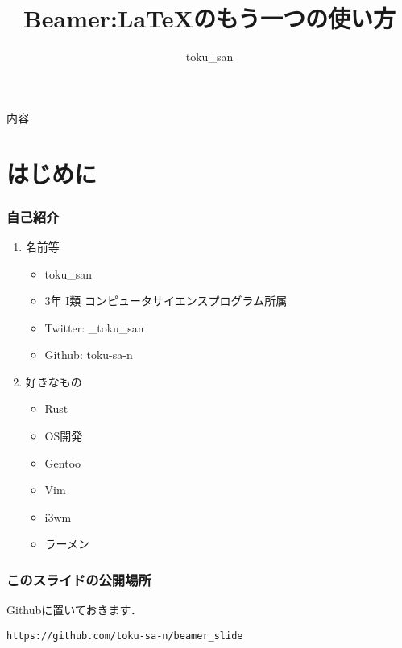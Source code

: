 \documentclass[dvipdfmx,uplatex,a4j,12pt]{beamer}
\begin{document}
\title{Beamer:\LaTeX のもう一つの使い方}
\author{toku\_san}

\begin{frame}
    \titlepage
\end{frame}

\begin{frame}{内容}
    \tableofcontents
\end{frame}

\section{はじめに}

\begin{frame}
    \frametitle{自己紹介}

    \begin{enumerate}
        \item 名前等
            \begin{itemize}
                \item toku\_san
                \item 3年 I類 コンピュータサイエンスプログラム所属
                    \item Twitter: \_toku\_san
                \item Github: toku-sa-n
            \end{itemize}
        \item 好きなもの
            \begin{itemize}
                \item Rust
                \item OS開発
                \item Gentoo
                \item Vim
                \item i3wm
                \item ラーメン
            \end{itemize}
    \end{enumerate}
\end{frame}

\begin{frame}[fragile]
    \frametitle{このスライドの公開場所}

    Githubに置いておきます．

    \begin{verbatim}
https://github.com/toku-sa-n/beamer_slide
    \end{verbatim}
\end{frame}
\end{document}
